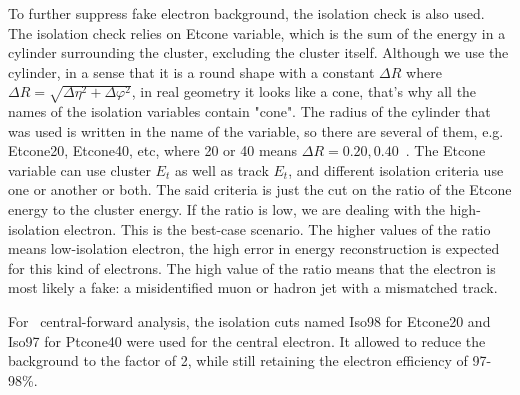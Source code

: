 To further suppress fake electron background, the isolation check is also used. The isolation check relies on Etcone variable, which is the sum of the energy in a cylinder surrounding the cluster, excluding the cluster itself. Although we use the cylinder, in a sense that it is a round shape with a constant $\Delta R$ where $\Delta R = \sqrt{\Delta\eta^{2} + \Delta\varphi^{2}}$, in real geometry it looks like a cone, that's why all the names of the isolation variables contain "cone".  The radius of the cylinder that was used is written in the name of the variable, so there are several of them, e.g. Etcone20, Etcone40, etc, where 20 or 40 means $\Delta R = 0.20 , 0.40$~\cite{lib:reco_iso}. The Etcone variable can use cluster $E_{t}$ as well as track $E_{t}$, and different isolation criteria use one or another or both. The said criteria is just the cut on the ratio of the Etcone energy to the cluster energy. If the ratio is low, we are dealing with the high-isolation electron. This is the best-case scenario. The higher values of the ratio means low-isolation electron, the high error in energy reconstruction is expected for this kind of electrons. The high value of the ratio means that the electron is most likely a fake: a misidentified muon or hadron jet with a mismatched track.

For \Zee\ central-forward analysis, the isolation cuts named Iso98 for Etcone20 and Iso97 for Ptcone40 were used for the central electron. It allowed to reduce the background to the factor of 2, while still retaining the electron efficiency of 97-98\%.
